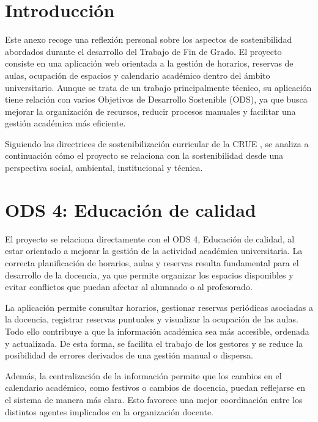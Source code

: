 
\section{Introducción}

Este anexo recoge una reflexión personal sobre los aspectos de sostenibilidad abordados durante el desarrollo del Trabajo de Fin de Grado. El proyecto consiste en una aplicación web orientada a la gestión de horarios, reservas de aulas, ocupación de espacios y calendario académico dentro del ámbito universitario. Aunque se trata de un trabajo principalmente técnico, su aplicación tiene relación con varios Objetivos de Desarrollo Sostenible (ODS), ya que busca mejorar la organización de recursos, reducir procesos manuales y facilitar una gestión académica más eficiente.

Siguiendo las directrices de sostenibilización curricular de la CRUE \cite{crue2012sostenibilidad}, se analiza a continuación cómo el proyecto se relaciona con la sostenibilidad desde una perspectiva social, ambiental, institucional y técnica.

\section{ODS 4: Educación de calidad}

El proyecto se relaciona directamente con el ODS 4, Educación de calidad, al estar orientado a mejorar la gestión de la actividad académica universitaria. La correcta planificación de horarios, aulas y reservas resulta fundamental para el desarrollo de la docencia, ya que permite organizar los espacios disponibles y evitar conflictos que puedan afectar al alumnado o al profesorado.

La aplicación permite consultar horarios, gestionar reservas periódicas asociadas a la docencia, registrar reservas puntuales y visualizar la ocupación de las aulas. Todo ello contribuye a que la información académica sea más accesible, ordenada y actualizada. De esta forma, se facilita el trabajo de los gestores y se reduce la posibilidad de errores derivados de una gestión manual o dispersa.

Además, la centralización de la información permite que los cambios en el calendario académico, como festivos o cambios de docencia, puedan reflejarse en el sistema de manera más clara. Esto favorece una mejor coordinación entre los distintos agentes implicados en la organización docente.

